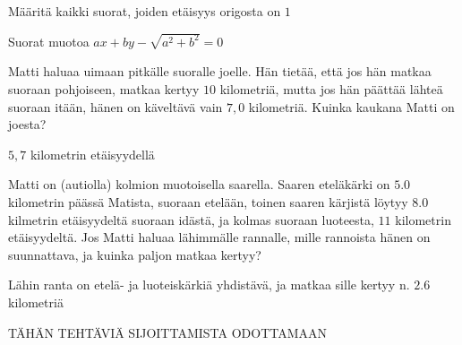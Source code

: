 \begin{tehtavasivu}
\begin{tehtava}
\begin{alakohdat}
\end{alakohdat}
\begin{vastaus}
\begin{alakohdat}
\end{alakohdat}
\end{vastaus}
\end{tehtava}

\begin{tehtava}
Määritä kaikki suorat, joiden etäisyys origosta on $1$
\begin{vastaus}
Suorat muotoa $ax+by-\sqrt{a^2+b^2} = 0$
\end{vastaus}
\end{tehtava}

\begin{tehtava}
Matti haluaa uimaan pitkälle suoralle joelle. Hän tietää, että jos hän matkaa suoraan pohjoiseen, matkaa kertyy $10$ kilometriä, mutta jos hän päättää lähteä suoraan itään, hänen on käveltävä vain $7,0$ kilometriä. Kuinka kaukana Matti on joesta?
\begin{vastaus}
$5,7$ kilometrin etäisyydellä
\end{vastaus}
\end{tehtava}

\begin{tehtava}
Matti on (autiolla) kolmion muotoisella saarella. Saaren eteläkärki on $5.0$ kilometrin päässä Matista, suoraan etelään, toinen saaren kärjistä löytyy $8.0$ kilmetrin etäisyydeltä suoraan idästä, ja kolmas suoraan luoteesta, $11$ kilometrin etäisyydeltä. Jos Matti haluaa lähimmälle rannalle, mille rannoista hänen on suunnattava, ja kuinka paljon matkaa kertyy?
\begin{vastaus}
Lähin ranta on etelä- ja luoteiskärkiä yhdistävä, ja matkaa sille kertyy n. $2.6$ kilometriä
\end{vastaus}
\end{tehtava}
TÄHÄN TEHTÄVIÄ SIJOITTAMISTA ODOTTAMAAN

\end{tehtavasivu}
